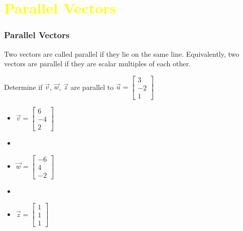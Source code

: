 \documentclass[pdf,9pt]{beamer}
\begin{document}
\section[\textcolor{yellow}{}]{\textcolor{yellow}{Parallel Vectors}}
\begin{frame}
\frametitle{Parallel Vectors}
\pause
\begin{definition}
    Two vectors are called \alert{parallel} if they lie on the same line. Equivalently, two vectors are parallel if they are scalar multiples of each other.
\end{definition}

\vspace{12pt}
\begin{example}

Determine if $\vec{v}$,  $\vec{w}$, $\vec{z}$ are parallel to
$
\vec{u} = \left[ \begin{array}{r} 3 \\ -2 \\ 1 \end{array} \right]
$
\begin{itemize}
    \item[]
	$
	\vec{v} = \left[ \begin{array}{r} 6 \\ -4 \\ 2 \end{array} \right]
	$
    \item[]
    \item[]
	$
	\vec{w} = \left[ \begin{array}{r} -6 \\ 4 \\ -2 \end{array} \right]
	$
    \item[]
    \item[]
	$
	\vec{z} = \left[ \begin{array}{r} 1 \\ 1 \\ 1 \end{array} \right]
	$
\end{itemize}
\end{example}
\end{frame}
\end{document}

